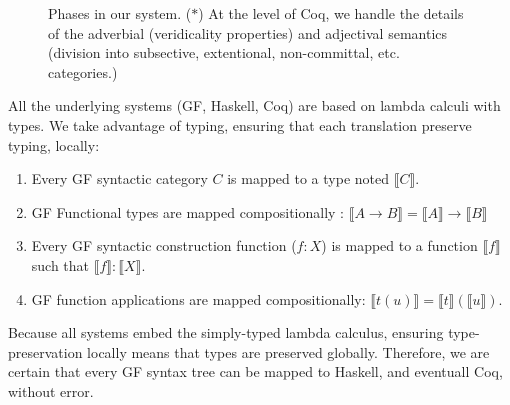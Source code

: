 \documentclass[11pt]{article}
\begin{document}
\begin{figure*}
  \centering
{
  \tiny
{}
}
\caption{Phases in our system. ($\ast$) At the level of Coq, we handle
  the details of the adverbial (veridicality properties) and
  adjectival semantics (division into subsective, extentional,
  non-committal, etc. categories.) }
  \label{fig:overview}
\end{figure*}

All the underlying systems (GF, Haskell, Coq) are based on lambda
calculi with types. We take advantage of typing, ensuring that each
translation preserve typing, locally:
\begin{enumerate}
\item Every GF syntactic category $C$ is mapped to a type noted $⟦C⟧$.
\item GF Functional types are mapped compositionally : $⟦A → B⟧ = ⟦A⟧ → ⟦B⟧$
\item Every GF syntactic construction function ($f : X$) is mapped to a function $⟦f⟧$ such that $⟦f⟧ : ⟦X⟧$.
\item GF function applications are mapped compositionally: $⟦t(u)⟧ = ⟦t⟧ (⟦u⟧)$.
\end{enumerate}
Because all systems embed the simply-typed lambda calculus, ensuring
type-preservation locally means that types are preserved globally.
Therefore, we are certain that every GF syntax tree can be mapped to
Haskell, and eventuall Coq, without error.
\end{document}
